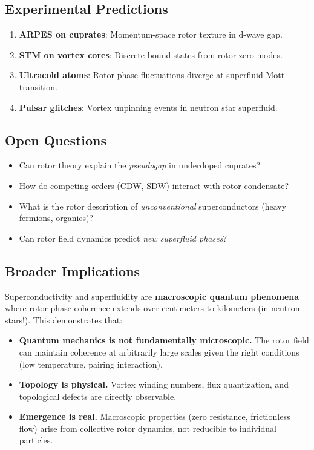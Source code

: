 \documentclass[12pt,a4paper]{article}
\theoremstyle{definition}
\theoremstyle{remark}
\begin{document}
\subsection{Experimental Predictions}

\begin{enumerate}
\item \textbf{ARPES on cuprates}: Momentum-space rotor texture in d-wave gap.
\item \textbf{STM on vortex cores}: Discrete bound states from rotor zero modes.
\item \textbf{Ultracold atoms}: Rotor phase fluctuations diverge at superfluid-Mott transition.
\item \textbf{Pulsar glitches}: Vortex unpinning events in neutron star superfluid.
\end{enumerate}

\subsection{Open Questions}

\begin{itemize}
\item Can rotor theory explain the \emph{pseudogap} in underdoped cuprates?
\item How do competing orders (CDW, SDW) interact with rotor condensate?
\item What is the rotor description of \emph{unconventional} superconductors (heavy fermions, organics)?
\item Can rotor field dynamics predict \emph{new superfluid phases}?
\end{itemize}

\subsection{Broader Implications}

Superconductivity and superfluidity are \textbf{macroscopic quantum phenomena} where rotor phase coherence extends over centimeters to kilometers (in neutron stars!). This demonstrates that:

\begin{itemize}
\item \textbf{Quantum mechanics is not fundamentally microscopic.} The rotor field can maintain coherence at arbitrarily large scales given the right conditions (low temperature, pairing interaction).
\item \textbf{Topology is physical.} Vortex winding numbers, flux quantization, and topological defects are directly observable.
\item \textbf{Emergence is real.} Macroscopic properties (zero resistance, frictionless flow) arise from collective rotor dynamics, not reducible to individual particles.
\end{itemize}
\end{document}
